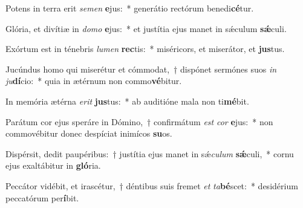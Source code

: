 \item Potens in terra erit \textit{se}\textit{men} \textbf{e}jus:~* generátio rectórum benedi\textbf{cé}tur.
\item Glória, et divítiæ in \textit{do}\textit{mo} \textbf{e}jus:~* et justítia ejus manet in sǽculum \textbf{sǽ}culi.
\item Exórtum est in ténebris \textit{lu}\textit{men} \textbf{rec}tis:~* miséricors, et miserátor, et \textbf{jus}tus.
\item Jucúndus homo qui miserétur et cómmodat,~† dispónet sermónes suos \textit{in} \textit{ju}\textbf{dí}cio:~* quia in ætérnum non commo\textbf{vé}bitur.
\item In memória ætérna \textit{e}\textit{rit} \textbf{jus}tus:~* ab auditióne mala non ti\textbf{mé}bit.
\item Parátum cor ejus speráre in Dómino,~† confirmátum \textit{est} \textit{cor} \textbf{e}jus:~* non commovébitur donec despíciat inimícos \textbf{su}os.
\item Dispérsit, dedit paupéribus:~† justítia ejus manet in sǽ\textit{cu}\textit{lum} \textbf{sǽ}culi,~* cornu ejus exaltábitur in \textbf{gló}ria.
\item Peccátor vidébit, et irascétur,~† déntibus suis fremet \textit{et} \textit{ta}\textbf{bé}scet:~* desidérium peccatórum per\textbf{í}bit.
